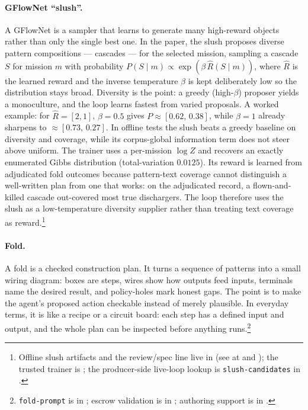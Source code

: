 \paragraph{GFlowNet ``slush''.} A GFlowNet is a sampler that learns to generate many high-reward objects rather than only the single best one.  In the paper, the slush proposes diverse pattern compositions --- cascades --- for the selected mission, sampling a cascade $S$ for mission $m$ with probability $P(S \mid m) \propto \exp(\beta\,\hat R(S\mid m))$, where $\hat R$ is the learned reward and the inverse temperature $\beta$ is kept deliberately low so the distribution stays broad.  Diversity is the point: a greedy (high-$\beta$) proposer yields a monoculture, and the loop learns fastest from varied proposals.  A worked example: for $\hat R=[2,1]$, $\beta=0.5$ gives $P\approx[0.62,\,0.38]$, while $\beta=1$ already sharpens to $\approx[0.73,\,0.27]$.  In offline tests the slush beats a greedy baseline on diversity and coverage, while its corpus-global information term does not steer above uniform.  The trainer uses a per-mission $\log Z$ and recovers an exactly enumerated Gibbs distribution (total-variation $0.0125$).  Its reward is learned from adjudicated fold outcomes because pattern-text coverage cannot distinguish a well-written plan from one that works: on the adjudicated record, a flown-and-killed cascade out-covered most true dischargers. The loop therefore uses the slush as a low-temperature diversity supplier rather than treating text coverage as reward.\footnote{Offline slush artifacts and the review/spec line live in  (see  at  and ); the trusted trainer is ; the producer-side live-loop lookup is \texttt{slush-candidates} in .}

\paragraph{Fold.} A fold is a checked construction plan.  It turns a sequence of patterns into a small wiring diagram: boxes are steps, wires show how outputs feed inputs, terminals name the desired result, and policy-holes mark honest gaps.  The point is to make the agent's proposed action checkable instead of merely plausible.  In everyday terms, it is like a recipe or a circuit board: each step has a defined input and output, and the whole plan can be inspected before anything runs.\footnote{\texttt{fold-prompt} is in ; escrow validation is in ; authoring support is in .}

